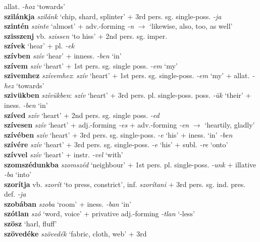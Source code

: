 \documentclass[11pt]{article}
\begin{document}
allat. \emph{-hoz} `towards' \\
\textbf{szilánkja} \emph{szilánk} `chip, shard, splinter' + 3rd
    pers. sg. single\hyp{}poss. \emph{-ja} \\
\textbf{szintén} \emph{szinte} `almost' +
adv.\hyp{}forming \emph{-n} $\rightarrow$ `likewise, also, too, as
well' \\
\textbf{szisszenj} vb. \emph{szissen} `to hiss' + 2nd
pers. sg. imper. \\
\textbf{szívek} `hear' + pl. \emph{-ek} \\
\textbf{szívben} \emph{szív} `hear' + inness. \emph{-ben} `in' \\
\textbf{szívem} \emph{szív} `heart' + 1st pers. sg. single
poss. \emph{-em} `my' \\
\textbf{szivemhez} \emph{szívemhez}: \emph{szív} `heart' + 1st
pers. sg. single\hyp{}poss. \emph{-em} `my' + allat. \emph{-hez}
`towards' \\
\textbf{szivükben} \emph{szívükben}: \emph{szív} `heart' + 3rd
pers. pl. single\hyp{}poss. poss. \emph{-ük} `their' + iness. \emph{-ben} `in' \\
\textbf{szíved} \emph{szív} `heart' + 2nd pers. sg. single
poss. \emph{-ed} \\
\textbf{szívesen} \emph{szív} `heart' + adj.\hyp{}forming \emph{-es} +
adv.\hyp{}forming \emph{-en} $\rightarrow$ `heartily, gladly' \\
\textbf{szívében} \emph{szív} `heart' + 3rd
pers. sg. single\hyp{}poss. \emph{-e} `his' +
iness. `in' \emph{-ben} \\
\textbf{szívére} \emph{szív} `heart' + 3rd
pers. sg. single\hyp{}poss. \emph{-e} `his' + subl. \emph{-re} `onto' \\
\textbf{szívvel} \emph{szív} `heart' + instr. \emph{-vel}
  `with' \\
\textbf{szomszédunkba} \emph{szomszéd} `neighbour' + 1st
pers. pl. single\hyp{}poss. \emph{-unk} + illative \emph{-ba} `into' \\
\textbf{szorítja} vb. \emph{szorít} `to press, constrict',
inf. \emph{szorítani} + 3rd pers. sg. ind. pres. def. \emph{-ja} \\
\textbf{szobában} \emph{szoba} `room' + iness. \emph{-ban} `in' \\
\textbf{szótlan} \emph{szó} `word, voice' + privative
adj.\hyp{}forming \emph{-tlan} `-less' \\
\textbf{szösz} `harl, fluff' \\
\textbf{szövedéke} \emph{szövedék} `fabric, cloth, web' + 3rd
\end{document}
